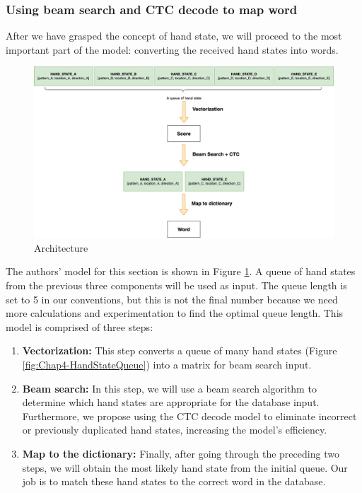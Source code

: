 \subsubsection{ Using beam search and CTC decode to map word}

After we have grasped the concept of hand state, we will proceed to the most important part of the model: converting the received hand states into words.      

\begin{figure}[H]
  \centering
  \includegraphics[width=\textwidth]{img/Chap4/Architechture.png}
  \caption{Architecture}
  \label{fig:Chap4-Architechture}
\end{figure}

The authors' model for this section is shown in Figure \ref{fig:Chap4-Architechture}. A queue of hand states from the previous three components will be used as input. The queue length is set to 5 in our conventions, but this is not the final number because we need more calculations and experimentation to find the optimal queue length. This model is comprised of three steps:

\begin{enumerate}
  \item \textbf{Vectorization:} This step converts a queue of many hand states (Figure \ref{fig:Chap4-HandStateQueue}) into a matrix for beam search input.
  \item \textbf{Beam search:} In this step, we will use a beam search algorithm to determine which hand states are appropriate for the database input. Furthermore, we propose using the CTC decode model to eliminate incorrect or previously duplicated hand states, increasing the model's efficiency.
  \item \textbf{Map to the dictionary:} Finally, after going through the preceding two steps, we will obtain the most likely hand state from the initial queue. Our job is to match these hand states to the correct word in the database.
\end{enumerate}
      

